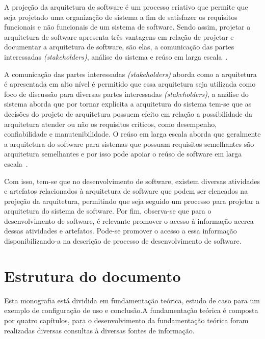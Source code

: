 A projeção da arquitetura de software é um processo criativo que permite que seja projetado uma organização de sistema a fim de satisfazer os requisitos funcionais e não funcionais de um sistema de software. Sendo assim, projetar a arquitetura de software apresenta três vantagens em relação de projetar e documentar a arquitetura de software, são elas, a comunicação das partes interessadas \emph{(stakeholders)}, análise do sistema e reúso em larga escala~\cite{Sommerville_2011_texbook}.

A comunicação das partes interessadas \emph{(stakeholders)} aborda como a arquitetura é apresentada em alto nível é permitido que essa arquitetura seja utilizada como foco de discussão para diversas partes interessadas \emph{(stakeholders)}, a análise do sistema aborda que por tornar explícita a arquitetura do sistema tem-se que as decisões do projeto de arquitetura possuem efeito em relação a possibilidade da arquitetura atender ou não os requisitos críticos, como desempenho, confiabilidade e manutenibilidade. O reúso em larga escala aborda que geralmente a arquitetura do software para sistemas que possuam requisitos semelhantes são arquitetura semelhantes e por isso pode apoiar o reúso de software em larga escala~\cite{Sommerville_2011_texbook}.

Com isso, tem-se que no desenvolvimento de software, existem diversas atividades e artefatos relacionados à arquitetura de software que podem ser elencados na projeção da arquitetura, permitindo que seja seguido um processo para projetar a arquitetura do sistema de software. Por fim, observa-se que para o desenvolvimento de software, é relevante promover o acesso à informação acerca dessas atividades e artefatos. Pode-se promover o acesso a essa informação disponibilizando-a na descrição de processo de desenvolvimento de software.

\section{Estrutura do documento}

Esta monografia está dividida em fundamentação teórica, estudo de caso para um exemplo de configuração de uso e conclusão.A fundamentação teórica é composta por quatro capítulos, para o desenvolvimento da fundamentação teórica foram realizadas diversas consultas à diversas fontes de informação.

